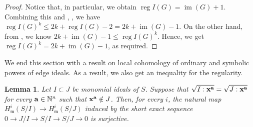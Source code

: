 \documentclass[12pt]{amsart}
\newtheorem{lemma}[thm]{Lemma}
\theoremstyle{definition}
\theoremstyle{remark}
\DeclareMathOperator{\reg}{reg}
\DeclareMathOperator{\im}{im}
\begin{document}
\begin{proof}
Notice that, in particular, we obtain $\reg I(G)=\im(G)+1$. Combining this and \cite[Corollary 5.5]{w2011}, \cite[Theorem 5.3]{js2021}, we have $\reg I(G)^{k}\leq 2k+\reg I(G)-2=2k+\im(G)-1$. On the other hand, from \cite[Theorem 4.5]{bht2015}, we know $2k+\im(G)-1\leq\reg I(G)^{k}$. Hence, we get $\reg I(G)^{k}=2k+\im(G)-1$, as required. 
\end{proof}

We end this section with a result on local cohomology of ordinary and symbolic powers of edge ideals. As a result, we also get an inequality for the regularity. 

\begin{lemma}\label{surj}
Let $I\subset J$ be monomial ideals of $S$. Suppose that $\sqrt{I:{\bf x}^{\bf a}}=\sqrt{J:{\bf x}^{\bf a}}$ for every ${\bf a}\in\mathbb{N}^{n}$ such that ${\bf x}^{\bf a}\notin J$. Then, for every $i$, the natural map $H_{\mathfrak{m}}^{i}(S/I)\rightarrow H_{\mathfrak{m}}^{i}(S/J)$ induced by the short exact sequence
$0\rightarrow J/I\rightarrow S/I\rightarrow S/J\rightarrow0$ is surjective. 
\end{lemma}
\end{document}
